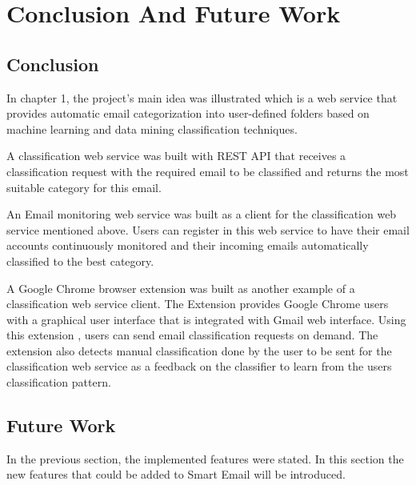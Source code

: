 
\chapter{Conclusion And Future Work} %

\label{Chapter7} %




\section{Conclusion}
In chapter 1, the project's main idea was illustrated which
is a web service that provides automatic email categorization into
user-defined folders based on machine learning and data mining
classification techniques.

A classification web service was built with REST API \cite{REST} that receives
a classification request with the required email to be classified and returns
the most suitable category for this email.

An Email monitoring web service was built as a client for the classification
web service mentioned above. Users can register in this web service to have
their email accounts continuously monitored and their incoming emails automatically
classified to the best category.

A Google Chrome browser \cite{CHROME} extension was built as another example of a
classification web service client. The Extension provides Google Chrome users
with a graphical user interface that is integrated with Gmail web interface.
Using this extension , users can send email classification requests on demand.
The extension also detects manual classification done by the user to be sent
for the classification web service as a feedback on the classifier to learn
from the users classification pattern.
\section{Future Work}
In the previous section, the implemented features were stated. In this section
the new features that could be added to Smart Email will be introduced.


